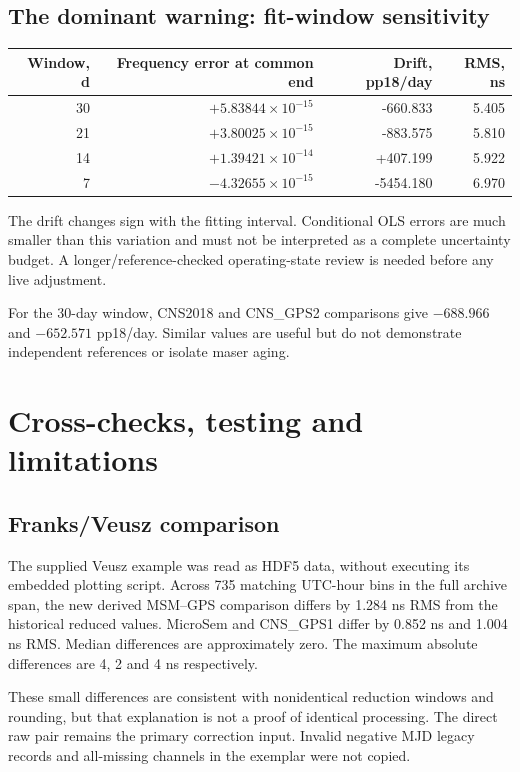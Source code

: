 \documentclass[11pt,a4paper]{article}
\begin{document}
\subsection{The dominant warning: fit-window sensitivity}
\begin{tabular}{@{}rrrr@{}}
\toprule
Window, d & Frequency error at common end & Drift, pp18/day & RMS, ns\\
\midrule
30 & \(+5.83844\times10^{-15}\) & -660.833 & 5.405\\
21 & \(+3.80025\times10^{-15}\) & -883.575 & 5.810\\
14 & \(+1.39421\times10^{-14}\) & +407.199 & 5.922\\
7  & \(-4.32655\times10^{-15}\) & -5454.180 & 6.970\\
\bottomrule
\end{tabular}

The drift changes sign with the fitting interval. Conditional OLS errors are
much smaller than this variation and must not be interpreted as a complete
uncertainty budget. A longer/reference-checked operating-state review is
needed before any live adjustment.

For the 30-day window, CNS2018 and CNS\_GPS2 comparisons give \(-688.966\)
and \(-652.571\) pp18/day. Similar values are useful but do not demonstrate
independent references or isolate maser aging.
\clearpage

\section{Cross-checks, testing and limitations}
\subsection{Franks/Veusz comparison}
The supplied Veusz example was read as HDF5 data, without executing its
embedded plotting script. Across 735 matching UTC-hour bins in the full
archive span, the new derived MSM--GPS comparison differs by 1.284 ns RMS
from the historical reduced values. MicroSem and CNS\_GPS1 differ by
0.852 ns and 1.004 ns RMS. Median differences are approximately zero.
The maximum absolute differences are 4, 2 and 4 ns respectively.

These small differences are consistent with nonidentical reduction windows
and rounding, but that explanation is not a proof of identical processing.
The direct raw pair remains the primary correction input. Invalid negative
MJD legacy records and all-missing channels in the exemplar were not copied.
\end{document}
